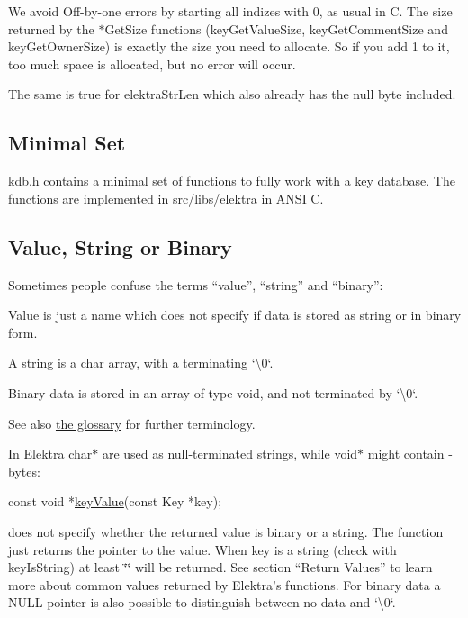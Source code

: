 We avoid Off-\/by-\/one errors by starting all indizes with 0, as usual in C. The size returned by the {\ttfamily $\ast$\+Get\+Size} functions ({\ttfamily key\+Get\+Value\+Size}, {\ttfamily key\+Get\+Comment\+Size} and {\ttfamily key\+Get\+Owner\+Size}) is exactly the size you need to allocate. So if you add 1 to it, too much space is allocated, but no error will occur.

The same is true for {\ttfamily elektra\+Str\+Len} which also already has the null byte included.

\subsection*{Minimal Set}

{\ttfamily kdb.\+h} contains a minimal set of functions to fully work with a key database. The functions are implemented in {\ttfamily src/libs/elektra} in A\+N\+SI C.

\subsection*{Value, String or Binary}

Sometimes people confuse the terms “value”, “string” and “binary”\+:


\begin{DoxyItemize}
\item Value is just a name which does not specify if data is stored as string or in binary form.
\item A string is a char array, with a terminating `\textquotesingle{}\textbackslash{}0\textquotesingle{}`.
\item Binary data is stored in an array of type void, and not terminated by `\textquotesingle{}\textbackslash{}0\textquotesingle{}`.
\end{DoxyItemize}

See also \hyperlink{doc_help_elektra-glossary_md}{the glossary} for further terminology.

In Elektra {\ttfamily char$\ast$} are used as null-\/terminated strings, while {\ttfamily void$\ast$} might contain {}-\/bytes\+:


\begin{DoxyCode}
\textcolor{keyword}{const} \textcolor{keywordtype}{void} *\hyperlink{group__keyvalue_ga6f29609c5da53c6dc26a98678d5752af}{keyValue}(\textcolor{keyword}{const} Key *key);
\end{DoxyCode}


does not specify whether the returned value is binary or a string. The function just returns the pointer to the value. When {\ttfamily key} is a string (check with {\ttfamily key\+Is\+String}) at least {\ttfamily \char`\"{}\char`\"{}} will be returned. See section “\+Return Values” to learn more about common values returned by Elektra’s functions. For binary data a {\ttfamily N\+U\+LL} pointer is also possible to distinguish between no data and `\textquotesingle{}\textbackslash{}0\textquotesingle{}`.


